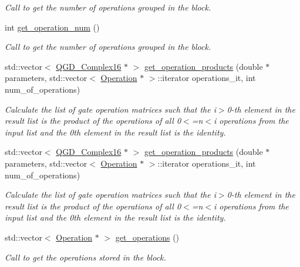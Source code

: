 \begin{DoxyCompactItemize}
\begin{DoxyCompactList}\small\item\em Call to get the number of operations grouped in the block. \end{DoxyCompactList}\item 
int \hyperlink{class_operation__block_a27592a2d25c7e74416de2b9d7997efca}{get\+\_\+operation\+\_\+num} ()
\begin{DoxyCompactList}\small\item\em Call to get the number of operations grouped in the block. \end{DoxyCompactList}\item 
std\+::vector$<$ \hyperlink{struct_q_g_d___complex16}{Q\+G\+D\+\_\+\+Complex16} $\ast$ $>$ \hyperlink{class_decomposition___base_a7f3fd202c32e65cbc312ec61d426442a}{get\+\_\+operation\+\_\+products} (double $\ast$parameters, std\+::vector$<$ \hyperlink{class_operation}{Operation} $\ast$ $>$\+::iterator operations\+\_\+it, int num\+\_\+of\+\_\+operations)
\begin{DoxyCompactList}\small\item\em Calculate the list of gate operation matrices such that the i$>$0-\/th element in the result list is the product of the operations of all 0$<$=n$<$i operations from the input list and the 0th element in the result list is the identity. \end{DoxyCompactList}\item 
std\+::vector$<$ \hyperlink{struct_q_g_d___complex16}{Q\+G\+D\+\_\+\+Complex16} $\ast$ $>$ \hyperlink{class_decomposition___base_a7e6efc3b157653de20275e234d4df3d9}{get\+\_\+operation\+\_\+products} (double $\ast$parameters, std\+::vector$<$ \hyperlink{class_operation}{Operation} $\ast$ $>$\+::iterator operations\+\_\+it, int num\+\_\+of\+\_\+operations)
\begin{DoxyCompactList}\small\item\em Calculate the list of gate operation matrices such that the i$>$0-\/th element in the result list is the product of the operations of all 0$<$=n$<$i operations from the input list and the 0th element in the result list is the identity. \end{DoxyCompactList}\item 
std\+::vector$<$ \hyperlink{class_operation}{Operation} $\ast$ $>$ \hyperlink{class_operation__block_a489d0c5758732ca49d5f5aca225e9318}{get\+\_\+operations} ()
\begin{DoxyCompactList}\small\item\em Call to get the operations stored in the block. \end{DoxyCompactList}\item 

\end{DoxyCompactItemize}
